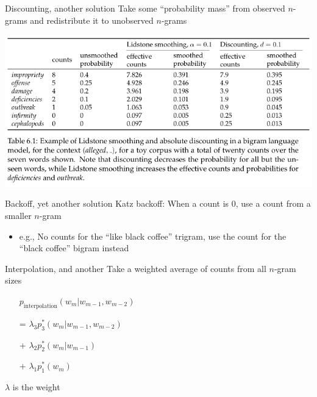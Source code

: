 \documentclass{beamer}
\begin{document}
      \begin{frame}{\subthree}
        \begin{block}{Discounting, another solution}
          Take some ``probability mass'' from observed $n$-grams and redistribute it to unobserved $n$-grams
        \end{block}
        \includegraphics[scale=0.5]{smooth_discount.png}
      \end{frame}

      \begin{frame}{\subthree}
        \begin{block}{Backoff, yet another solution}
          Katz backoff: When a count is 0, use a count from a smaller $n$-gram
          \begin{itemize}
            \item e.g., No counts for the ``like black coffee'' trigram, use the count for the ``black coffee'' bigram instead
          \end{itemize}
        \end{block}
      \end{frame}

      \begin{frame}{\subthree}
        \begin{block}{Interpolation, and another}
          Take a weighted average of counts from all $n$-gram sizes
          \begin{itemize}
            \item[] $p_{\text{interpolation}} ( w_m | w_{m-1}, w_{m-2} )$
            \item[=] $\lambda_3 p_3^* ( w_m | w_{m-1}, w_{m-2} )$
            \item[+] $\lambda_2 p_2^* ( w_m | w_{m-1} )$
            \item[+] $\lambda_1 p_1^* ( w_m )$
          \end{itemize}
          $\lambda$ is the weight
        \end{block}
      \end{frame}
\end{document}
